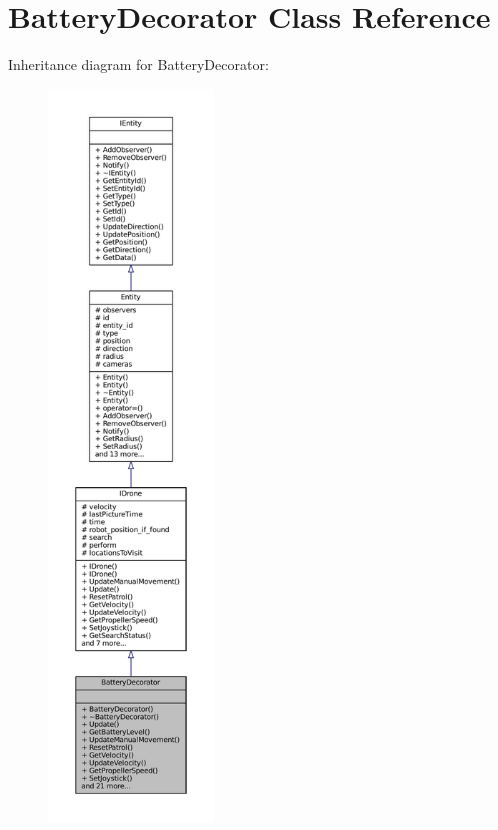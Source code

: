 \hypertarget{classBatteryDecorator}{}\section{Battery\+Decorator Class Reference}
\label{classBatteryDecorator}


Inheritance diagram for Battery\+Decorator\+:\nopagebreak
\begin{figure}[H]
\begin{center}
\leavevmode
\includegraphics[height=550pt]{classBatteryDecorator__inherit__graph}
\end{center}
\end{figure}


